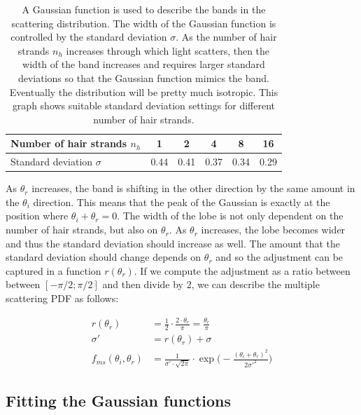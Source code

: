 \documentclass[11pt,a4paper]{report}
\begin{document}
\begin{table}[h]
\begin{center}
\begin{tabular}{l|c|c|c|c|c}
Number of hair strands $n_h$ & 1 & 2 & 4 & 8 & 16 \\
\hline
Standard deviation $\sigma$ & 0.44 & 0.41 & 0.37 & 0.34 & 0.29 \\
\end{tabular}
\caption{A Gaussian function is used to describe the bands in the scattering distribution. The width of the Gaussian function is controlled by the standard deviation $\sigma$. As the number of hair strands $n_h$ increases through which light scatters, then the width of the band increases and requires larger standard deviations so that the Gaussian function mimics the band. Eventually the distribution will be pretty much isotropic. This graph shows suitable standard deviation settings for different number of hair strands.}
\label{stddev_settings_for_number_of_hairstrands}
\end{center}
\end{table}

As $\theta_r$ increases, the band is shifting in the other direction by the same amount in the $\theta_i$ direction. This means that the peak of the Gaussian is exactly at the position where $\theta_i + \theta_r = 0$. The width of the lobe is not only dependent on the number of hair strands, but also on $\theta_r$. As $\theta_r$ increases, the lobe becomes wider and thus the standard deviation should increase as well. The amount that the standard deviation should change depends on $\theta_r$ and so the adjustment can be captured in a function $r(\theta_r)$. If we compute the adjustment as a ratio between between $[-\pi/2 ; \pi/2]$ and then divide by 2, we can describe the multiple scattering PDF as follows:

\begin{align}
r(\theta_r) &= \frac{1}{2} \cdot \frac{2 \cdot \theta_r}{\pi} = \frac{\theta_r}{\pi}\\
\sigma' &= r(\theta_r) + \sigma \\
f_{ms}(\theta_i, \theta_r) &= \frac{1}{\sigma' \cdot \sqrt{2 \pi}} \cdot \exp \Big ( -\frac{(\theta_i + \theta_r)^2}{2 \sigma'^2} \Big )
\end{align}

\subsection{Fitting the Gaussian functions}
\end{document}
